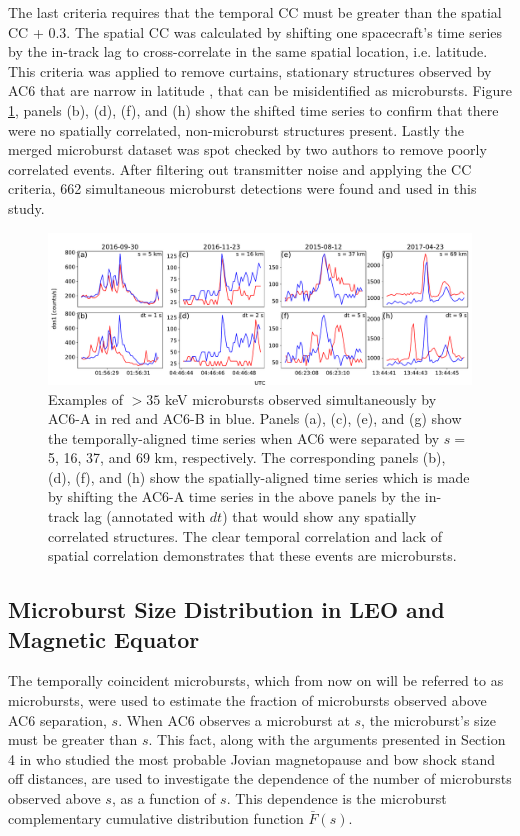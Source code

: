 \documentclass[draft]{agujournal2019}
\begin{document}
The last criteria requires that the temporal CC must be greater than the spatial CC + 0.3. The spatial CC was calculated by shifting one spacecraft's time series by the in-track lag to cross-correlate in the same spatial location, i.e. latitude. This criteria was applied to remove curtains, stationary structures observed by AC6 that are narrow in latitude \cite{Blake2016}, that can be misidentified as microbursts. Figure \ref{fig2}, panels (b), (d), (f), and (h) show the shifted time series to confirm that there were no spatially correlated, non-microburst structures present. Lastly the merged microburst dataset was spot checked by two authors to remove poorly correlated events. After filtering out transmitter noise and applying the CC criteria, 662 simultaneous microburst detections were found and used in this study.

\begin{figure}
\includegraphics[width=\textwidth]{fig2.pdf}
\caption{Examples of $>35$ keV microbursts observed simultaneously by AC6-A in red and AC6-B in blue. Panels (a), (c), (e), and (g) show the temporally-aligned time series when AC6 were separated by $s=$ 5, 16, 37, and 69 km, respectively. The corresponding panels (b), (d), (f), and (h) show the spatially-aligned time series which is made by shifting the AC6-A time series in the above panels by the in-track lag (annotated with $dt$) that would show any spatially correlated structures. The clear temporal correlation and lack of spatial correlation demonstrates that these events are microbursts.} 
\label{fig2}
\end{figure}
	

\subsection{Microburst Size Distribution in LEO and Magnetic Equator}\label{microburst_distribution}
The temporally coincident microbursts, which from now on will be referred to as microbursts, were used to estimate the fraction of microbursts observed above AC6 separation, $s$. When AC6 observes a microburst at $s$, the microburst's size must be greater than $s$. This fact, along with the arguments presented in Section 4 in  who studied the most probable Jovian magnetopause and bow shock stand off distances, are used to investigate the dependence of the number of microbursts observed above $s$, as a function of $s$. This dependence is the microburst complementary cumulative distribution function $\bar{F}(s)$. 
\end{document}
